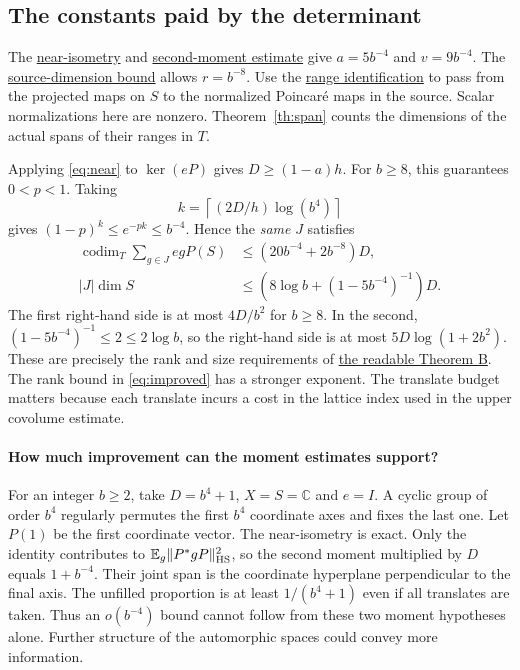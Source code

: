 \documentclass[11pt]{article}
\newcommand{\src}[3]{\href{https://github.com/lsernau/grh-lean/blob/72fead102f663d5c7a407964a13dc0cf9d977207/grh/src/#1.lean\#L#2}{#3}}
\begin{document}
\newpage
\subsection*{The constants paid by the determinant}
The \src{New/Spanning/SecondMoment/SpanningTheorem}{257}{near-isometry} and \src{New/Spanning/SecondMoment/SpanningTheorem}{288}{second-moment estimate} give $a=5b^{-4}$ and $v=9b^{-4}$. The \src{New/Reduction/ShortAndEnough}{410}{source-dimension bound} allows $r=b^{-8}$. Use the \src{New/Reduction/ShortAndEnough}{386}{range identification} to pass from the projected maps on $S$ to the normalized Poincar\'e maps in the source. Scalar normalizations here are nonzero. Theorem~\ref{th:span} counts the dimensions of the actual spans of their ranges in $T$.

Applying \eqref{eq:near} to $\ker(eP)$ gives $D\ge(1-a)h$. For $b\ge8$, this guarantees $0<p<1$. Taking
\[
                   k=\left\lceil (2D/h)\log(b^4)\right\rceil
\]
gives $(1-p)^k\le e^{-pk}\le b^{-4}$. Hence the \emph{same} $J$ satisfies
\begin{align}
 \operatorname{codim}_T\sum_{g\in J}egP(S)
      &\le (20b^{-4}+2b^{-8})D,\label{eq:improved}\\
 |J|\dim S &\le (8\log b+(1-5b^{-4})^{-1})D .\label{eq:budget}
\end{align}
The first right-hand side is at most $4D/b^2$ for $b\ge8$. In the second, $(1-5b^{-4})^{-1}\le2\le2\log b$, so the right-hand side is at most $5D\log(1+2b^2)$. These are precisely the rank and size requirements of \src{New/Reduction/ShortAndEnough}{448}{the readable Theorem B}. The rank bound in \eqref{eq:improved} has a stronger exponent. The translate budget matters because each translate incurs a cost in the lattice index used in the upper covolume estimate.

\paragraph{How much improvement can the moment estimates support?} For an integer $b\ge2$, take $D=b^4+1$, $X=S=\mathbb C$ and $e=I$. A cyclic group of order $b^4$ regularly permutes the first $b^4$ coordinate axes and fixes the last one. Let $P(1)$ be the first coordinate vector. The near-isometry is exact. Only the identity contributes to $\mathbb E_g\|P^*gP\|_{\rm HS}^2$, so the second moment multiplied by $D$ equals $1+b^{-4}$. Their joint span is the coordinate hyperplane perpendicular to the final axis. The unfilled proportion is at least $1/(b^4+1)$ even if all translates are taken. Thus an $o(b^{-4})$ bound cannot follow from these two moment hypotheses alone. Further structure of the automorphic spaces could convey more information.
\end{document}
